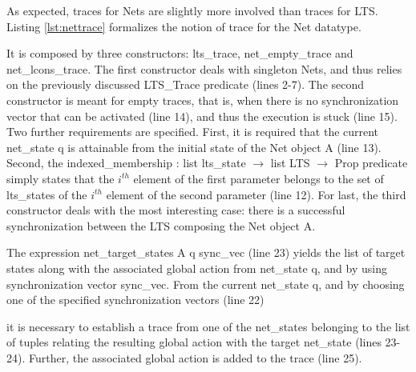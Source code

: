 			
		As expected, traces for \textsf{Net}s are slightly more involved than traces for \textsc{LTS}. 
	Listing \ref{lst:nettrace} formalizes the notion of trace for the \textsf{Net} datatype.
			

			
	
	\noindent It is composed by three constructors: \textsf{lts\_trace},
	\textsf{net\_empty\_trace} and \textsf{net\_lcons\_trace}.
	The first constructor deals with singleton \textsf{Net}s, and thus relies on
	the previously discussed \textsf{LTS\_Trace} predicate (lines 2-7).		
	The second constructor is meant for empty traces, that is, when there is no
	synchronization vector that can be activated (line 14), 
	and thus the execution is stuck (line 15). Two further requirements are specified.
	First, it is required that the current \textsf{net\_state} \textsf{q} is 
	attainable from the initial state of the \textsf{Net} object \textsf{A} (line 13). Second, 
	the 
	\textsf{indexed\_membership : list lts\_state $\rightarrow$ list LTS $\rightarrow$ Prop}
	predicate simply states that the $i^{th}$ element of the first parameter belongs to the set of \textsf{lts\_states} 
	of the $i^{th}$ element of the second parameter (line 12).
	For last, the third constructor deals with the most interesting case: there is a successful synchronization
	between the \ac{LTS} composing the \textsf{Net} object \textsf{A}. 
		
	
	
	
	The expression
	\textsf{net\_target\_states A q sync\_vec} (line 23) yields the list of target states along with
	the associated global \textsf{action} from \textsf{net\_state} \textsf{q}, and by using 
	synchronization vector \textsf{sync\_vec}.
	From the current \textsf{net\_state} \textsf{q}, and by choosing 
	one of the specified synchronization vectors (line 22)

	
	
	
	it is necessary to establish 
	a trace   from one of the \textsf{net\_state}s belonging	
	to the list of tuples relating the resulting global action with the target \textsf{net\_state} (lines 23-24). 
	Further, the associated global action is added to the trace (line 25).	
	
		
		
